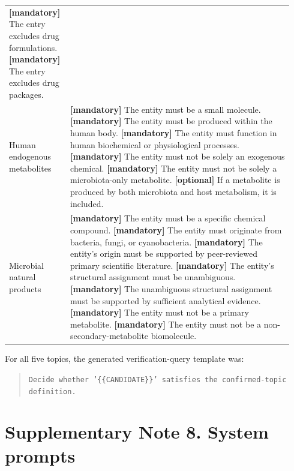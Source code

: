 \documentclass[10pt]{article}
\begin{document}
\begin{longtable}{p{0.18\linewidth}p{0.76\linewidth}}
\textbf{[mandatory]} The entry excludes drug formulations.\newline
\textbf{[mandatory]} The entry excludes drug packages.
\\
Human endogenous metabolites &
\textbf{[mandatory]} The entity must be a small molecule.\newline
\textbf{[mandatory]} The entity must be produced within the human body.\newline
\textbf{[mandatory]} The entity must function in human biochemical or physiological processes.\newline
\textbf{[mandatory]} The entity must not be solely an exogenous chemical.\newline
\textbf{[mandatory]} The entity must not be solely a microbiota-only metabolite.\newline
\textbf{[optional]} If a metabolite is produced by both microbiota and host metabolism, it is included.
\\
Microbial natural products &
\textbf{[mandatory]} The entity must be a specific chemical compound.\newline
\textbf{[mandatory]} The entity must originate from bacteria, fungi, or cyanobacteria.\newline
\textbf{[mandatory]} The entity's origin must be supported by peer-reviewed primary scientific literature.\newline
\textbf{[mandatory]} The entity's structural assignment must be unambiguous.\newline
\textbf{[mandatory]} The unambiguous structural assignment must be supported by sufficient analytical evidence.\newline
\textbf{[mandatory]} The entity must not be a primary metabolite.\newline
\textbf{[mandatory]} The entity must not be a non-secondary-metabolite biomolecule.
\\
\bottomrule
\end{longtable}

For all five topics, the generated verification-query template was:
\begin{quote}
\texttt{Decide whether '\{\{CANDIDATE\}\}' satisfies the confirmed-topic definition.}
\end{quote}


\section*{Supplementary Note 8. System prompts}
\end{document}
